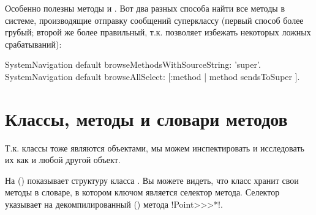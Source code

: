 \documentclass[a4paper,10pt,twoside]{book}
\begin{document}
Особенно полезны методы  и . Вот два разных способа найти все методы в системе, производящие отправку сообщений суперклассу (первый способ более грубый; второй же более правильный, т.к. позволяет избежать некоторых ложных срабатываний):
\begin{code}{}
SystemNavigation default browseMethodsWithSourceString: 'super'.
SystemNavigation default browseAllSelect: [:method | method sendsToSuper ].
\end{code}

\section{Классы, методы и словари методов}

Т.к. классы тоже являются объектами, мы можем инспектировать и исследовать их как и любой другой объект.


На   () показывает структуру класса .
Вы можете видеть, что класс хранит свои методы в словаре, в котором ключом является селектор метода.
Селектор \ct{#*} указывает на декомпилированный  () метода \ct!Point>>>*!.
\end{document}

